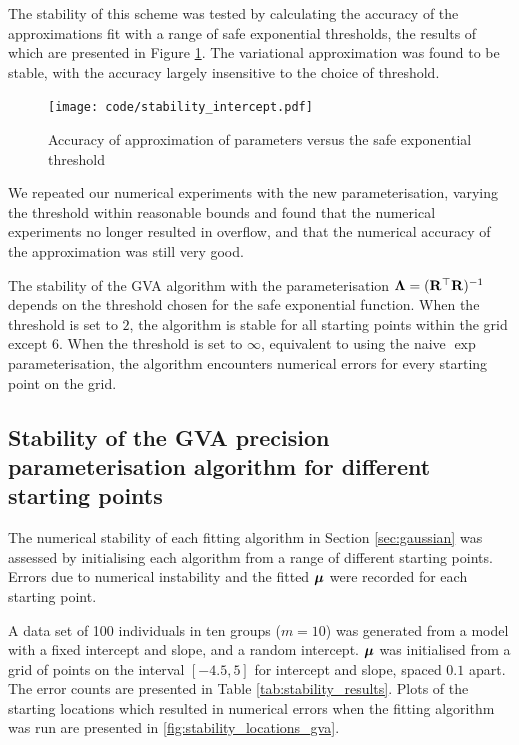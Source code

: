 The stability of this scheme was tested by calculating the accuracy of the
approximations fit with a range of safe exponential thresholds, the results of
which are presented in Figure \ref{fig:stability_accuracy}. The variational
approximation was found to be stable, with the accuracy largely insensitive to
the choice of threshold.

\begin{figure}[h]
	\texttt{[image: code/stability\_intercept.pdf]}
	\label{fig:stability_accuracy}
	\caption{Accuracy of approximation of parameters versus the safe exponential threshold}
\end{figure}

We repeated our numerical experiments with the new parameterisation, varying
the threshold within reasonable bounds and found that the numerical experiments
no longer resulted in overflow, and that the numerical accuracy of the
approximation was still very good.

The stability of the GVA algorithm with the parameterisation ${\boldsymbol \Lambda} =
({\bf R}^\top {\bf R})^{-1}$ depends on the threshold chosen for the safe exponential
function. When the threshold is set to $2$, the algorithm is stable for all
starting points within the grid except $6$. When the threshold is set to
$\infty$, equivalent to using the naive $\exp$ parameterisation, the algorithm
encounters numerical errors for every starting point on the  grid.
	
\subsection{Stability of the GVA precision parameterisation algorithm for different starting points}
		
The numerical stability of each fitting algorithm in Section \ref{sec:gaussian}
was assessed by initialising each algorithm from a range of different starting
points. Errors due to numerical instability and the fitted ${\boldsymbol \mu}$ were recorded
for each starting point.
		
A data set of 100 individuals in ten groups ($m=10$) was generated from a model
with a fixed intercept and slope, and a random intercept. ${\boldsymbol \mu}$ was
initialised from a grid of points on the interval $[-4.5, 5]$ for intercept and
slope, spaced $0.1$ apart. The error counts are presented in Table
\ref{tab:stability_results}. Plots of the starting locations which resulted in
numerical errors when the fitting algorithm was run are presented in
\ref{fig:stability_locations_gva}.
		

